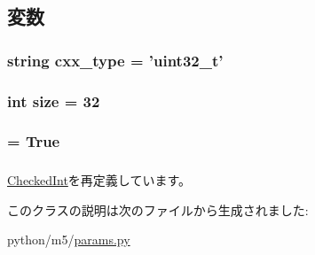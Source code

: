 \subsection{変数}
\hypertarget{classm5_1_1params_1_1MemorySize32_a2f1553ebb79374a68b36fdd6d8d82fc3}{
\subsubsection[{cxx\_\-type}]{\setlength{\rightskip}{0pt plus 5cm}string {\bf cxx\_\-type} = '{\bf uint32\_\-t}'}}
\label{classm5_1_1params_1_1MemorySize32_a2f1553ebb79374a68b36fdd6d8d82fc3}
\hypertarget{classm5_1_1params_1_1MemorySize32_a439227feff9d7f55384e8780cfc2eb82}{
\subsubsection[{size}]{\setlength{\rightskip}{0pt plus 5cm}int {\bf size} = 32}}
\label{classm5_1_1params_1_1MemorySize32_a439227feff9d7f55384e8780cfc2eb82}
\hypertarget{classm5_1_1params_1_1MemorySize32_aca40206900cfc164654362fa8d4ad1e6}{
\subsubsection[{unsigned}]{ = True}}
\label{classm5_1_1params_1_1MemorySize32_aca40206900cfc164654362fa8d4ad1e6}
\hypertarget{classm5_1_1params_1_1MemorySize32_afcc7a4b78ecd8fa7e713f8cfa0f51017}{
\subsubsection[{value}]{}}
\label{classm5_1_1params_1_1MemorySize32_afcc7a4b78ecd8fa7e713f8cfa0f51017}


\hyperlink{classm5_1_1params_1_1CheckedInt_afcc7a4b78ecd8fa7e713f8cfa0f51017}{CheckedInt}を再定義しています。

このクラスの説明は次のファイルから生成されました:\begin{DoxyCompactItemize}
\item 
python/m5/\hyperlink{params_8py}{params.py}\end{DoxyCompactItemize}
